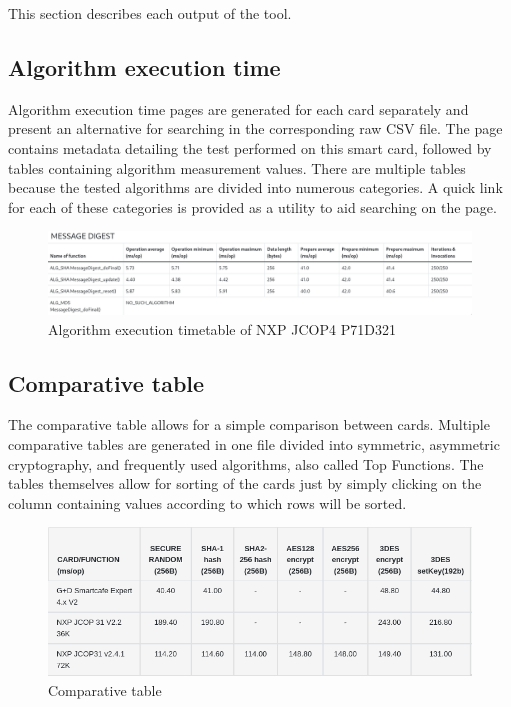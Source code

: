 This section describes each output of the tool.

\subsection{Algorithm execution time}
Algorithm execution time pages are generated for each card separately and present an alternative for searching in the corresponding raw CSV file. The page contains metadata detailing the test performed on this smart card, followed by tables containing algorithm measurement values. There are multiple tables because the tested algorithms are divided into numerous categories. A quick link for each of these categories is provided as a utility to aid searching on the page.

\begin{figure}[h]
    \centering
    \includegraphics[width=\textwidth]{img/NXP JCOP4 P71D321 execution-time table.png}
    \caption{Algorithm execution timetable of NXP JCOP4 P71D321}
    \label{fig:execution-time-table}
\end{figure}

\subsection{Comparative table}
The comparative table allows for a simple comparison between cards. Multiple comparative tables are generated in one file divided into symmetric, asymmetric cryptography, and frequently used algorithms, also called Top Functions. The tables themselves allow for sorting of the cards just by simply clicking on the column containing values according to which rows will be sorted.

\begin{figure}[h]
    \centering
    \includegraphics[width=\textwidth]{img/comparative-table.png}
    \caption{Comparative table}
    \label{fig:comparative-table}
\end{figure}

